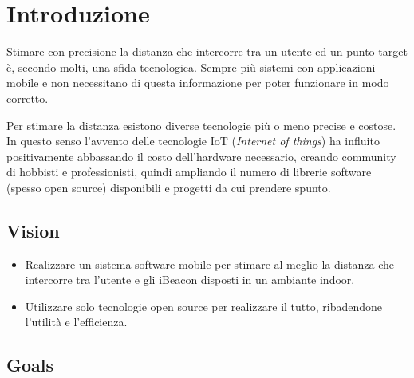 \chapter{Introduzione}

Stimare con precisione la distanza che intercorre tra un utente ed un punto target è, secondo molti, una sfida tecnologica. Sempre più sistemi	 con applicazioni mobile e non necessitano di questa informazione per poter funzionare in modo corretto. 
	
Per stimare la distanza esistono diverse tecnologie più o meno precise e costose. In questo senso l'avvento delle tecnologie IoT (\textit{Internet of things}) ha influito positivamente abbassando il costo dell'hardware necessario, creando community di hobbisti e professionisti, quindi ampliando il numero di librerie software (spesso open source) disponibili e progetti da cui prendere spunto.
	
\section{Vision}

\begin{itemize}
	\item Realizzare un sistema software mobile per stimare al meglio la distanza che intercorre tra l'utente e gli iBeacon disposti in un ambiante indoor.
	
	\item Utilizzare solo tecnologie open source per realizzare il tutto, ribadendone l'utilità e l'efficienza.
\end{itemize}

\section{Goals}
